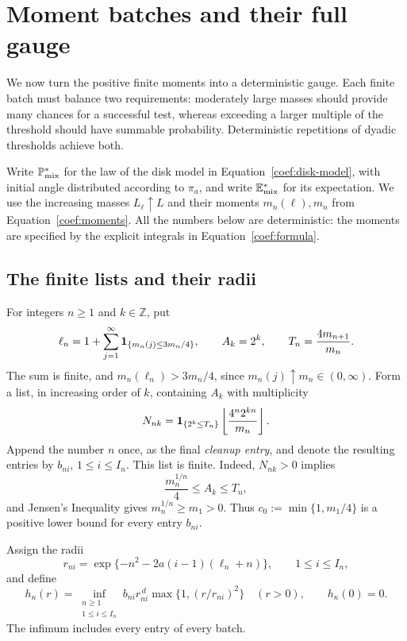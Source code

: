 \section{Moment batches and their full gauge}\label{gauge:section}

We now turn the positive finite moments into a deterministic gauge.
Each finite batch must balance two requirements: moderately large masses
should provide many chances for a successful test, whereas exceeding a
larger multiple of the threshold should have summable probability.
Deterministic repetitions of dyadic thresholds achieve both.

Write \(\mathbb P^*_{\mathrm{mix}}\) for the law of the disk model in
Equation~\eqref{coef:disk-model}, with initial angle distributed according
to \(\pi_a\), and write \(\mathbb E^*_{\mathrm{mix}}\) for its expectation.
We use the increasing masses \(L_\ell\uparrow L\) and their moments
\(m_n(\ell),m_n\) from Equation~\eqref{coef:moments}. All the numbers below
are deterministic: the moments are specified by the explicit integrals
in Equation~\eqref{coef:formula}.

\subsection{The finite lists and their radii}

For integers \(n\ge1\) and \(k\in\mathbb Z\), put
\begin{equation}\label{gauge:coefficients}
\ell_n=1+\sum_{j=1}^\infty
\mathbf 1_{\{m_n(j)\le 3m_n/4\}},
\qquad A_k=2^k,
\qquad T_n=\frac{4m_{n+1}}{m_n}.
\end{equation}
The sum is finite, and \(m_n(\ell_n)>3m_n/4\), since
\(m_n(j)\uparrow m_n\in(0,\infty)\). Form a list, in increasing
order of \(k\), containing \(A_k\) with multiplicity
\begin{equation}\label{gauge:batch}
N_{nk}=\mathbf 1_{\{2^k\le T_n\}}
\left\lfloor\frac{4^n2^{kn}}{m_n}\right\rfloor.
\end{equation}
Append the number \(n\) once, as the final \emph{cleanup entry},
and denote the resulting entries by \(b_{ni}\), \(1\le i\le I_n\).
This list is finite. Indeed, \(N_{nk}>0\) implies
\[
\frac{m_n^{1/n}}4\le A_k\le T_n,
\]
and Jensen's Inequality gives \(m_n^{1/n}\ge m_1>0\).
Thus \(c_0:=\min\{1,m_1/4\}\) is a positive lower bound for every
entry \(b_{ni}\).

Assign the radii
\begin{equation}\label{gauge:radii}
r_{ni}=\exp\{-n^2-2a(i-1)(\ell_n+n)\},
\qquad 1\le i\le I_n,
\end{equation}
and define
\begin{equation}\label{gauge:definition}
\boxed{\quad
h_\kappa(r)=
\inf_{\substack{n\ge1\\1\le i\le I_n}}
b_{ni}r_{ni}^{\,d}\max\{1,(r/r_{ni})^2\}
\quad(r>0),\qquad h_\kappa(0)=0.
\quad}
\end{equation}
The infimum includes every entry of every batch.

